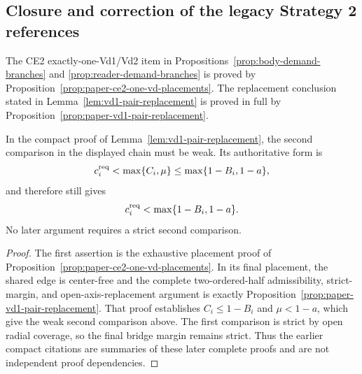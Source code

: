 \subsection{Closure and correction of the legacy Strategy 2 references}
\label{subsec:strategy2-cross-reference-closure}

\begin{proposition}
\label{prop:paper-strategy2-legacy-closure}
The CE2 exactly-one-Vd1/Vd2 item in
Propositions~\ref{prop:body-demand-branches} and
\ref{prop:reader-demand-branches} is proved by
Proposition~\ref{prop:paper-ce2-one-vd-placements}.  The replacement conclusion
stated in Lemma~\ref{lem:vd1-pair-replacement} is proved in full by
Proposition~\ref{prop:paper-vd1-pair-replacement}.

In the compact proof of Lemma~\ref{lem:vd1-pair-replacement}, the second
comparison in the displayed chain must be weak.  Its authoritative form is
\[
 c_i^{\rm req}<\max\{C_i,\mu\}
 \le\max\{1-B_i,1-a\},
\]
and therefore still gives
\[
 c_i^{\rm req}<\max\{1-B_i,1-a\}.
\]
No later argument requires a strict second comparison.
\end{proposition}

\begin{proof}
The first assertion is the exhaustive placement proof of
Proposition~\ref{prop:paper-ce2-one-vd-placements}.  In its final placement, the
shared edge is center-free and the complete two-ordered-half admissibility,
strict-margin, and open-axis-replacement argument is exactly
Proposition~\ref{prop:paper-vd1-pair-replacement}.  That proof establishes
$C_i\le1-B_i$ and $\mu<1-a$, which give the weak second comparison above.  The
first comparison is strict by open radial coverage, so the final bridge margin
remains strict.  Thus the earlier compact citations are summaries of these
later complete proofs and are not independent proof dependencies.
\end{proof}
